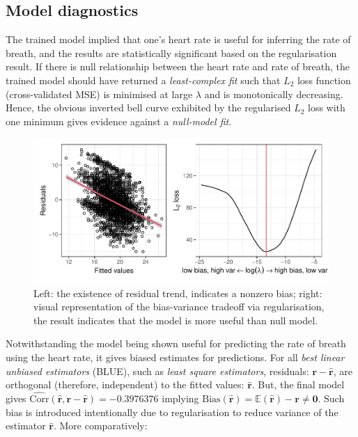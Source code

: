 \documentclass[
]{article}
\begin{document}
\newpage

\hypertarget{model-diagnostics}{%
\subsection{Model diagnostics}\label{model-diagnostics}}

The trained model implied that one's heart rate is useful for inferring
the rate of breath, and the results are statistically significant based
on the regularisation result. If there is null relationship between the
heart rate and rate of breath, the trained model should have returned a
\emph{least-complex fit} such that \(L_2\) loss function
(cross-validated MSE) is minimised at large \(\lambda\) and is
monotonically decreasing. Hence, the obvious inverted bell curve
exhibited by the regularised \(L_2\) loss with one minimum gives
evidence against a \emph{null-model fit}.

\begin{figure}

{\centering \includegraphics{report_files/figure-latex/resid-check-1} 

}

\caption{Left: the existence of residual trend, indicates a nonzero bias; right: visual representation of the bias-variance tradeoff via regularisation, the result indicates that the model is more useful than null model.}\label{fig:resid-check}
\end{figure}

Notwithstanding the model being shown useful for predicting the rate of
breath using the heart rate, it gives biased estimates for predictions.
For all \emph{best linear unbiased estimators} (BLUE), such as
\emph{least square estimators}, residuals:
\(\mathbf{r} - \mathbf{\hat{r}}\), are orthogonal (therefore,
independent) to the fitted values: \(\mathbf{\hat{r}}\). But, the final
model gives
\(\hat{\text{Corr}}(\mathbf{\hat{r}}, \mathbf{r} - \mathbf{\hat{r}}) = -0.3976376\)
implying
\(\text{Bias}(\mathbf{\hat{r}}) = \mathbb{E}(\mathbf{\hat{r}}) - \mathbf{r} \neq \mathbf{0}\).
Such bias is introduced intentionally due to regularisation to reduce
variance of the estimator \(\mathbf{\hat{r}}\). More comparatively:
\end{document}
